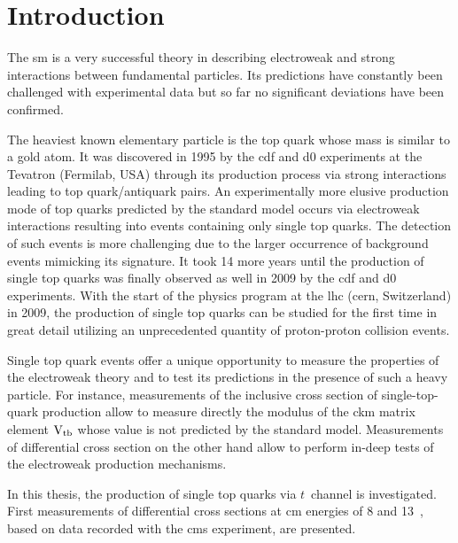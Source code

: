 \chapter*{Introduction}

The \acrlong{sm} is a very successful theory in describing electroweak and strong interactions between fundamental particles. Its predictions have constantly been challenged with experimental data but so far no significant deviations have been confirmed. 

The heaviest known elementary particle is the top quark whose mass is similar to a gold atom. It was discovered in 1995 by the \gls{cdf} and \gls{d0} experiments at the Tevatron (Fermilab, USA) through its production process via strong interactions leading to top quark/antiquark pairs. An experimentally more elusive production mode of top quarks predicted by the standard model occurs via electroweak interactions resulting into events containing only single top quarks. The detection of such events is more challenging due to the larger occurrence of background events mimicking its signature. It took 14 more years until the production of single top quarks was finally observed as well in 2009 by the \gls{cdf} and \gls{d0} experiments. With the start of the physics program at the \gls{lhc} (\gls{cern}, Switzerland) in 2009, the production of single top quarks can be studied for the first time in great detail utilizing an unprecedented quantity of proton-proton collision events.

Single top quark events offer a unique opportunity to measure the properties of the electroweak theory and to test its predictions in the presence of such a heavy particle. For instance, measurements of the inclusive cross section of single-top-quark production allow to measure directly the modulus of the \gls{ckm} matrix element ${\textrm{V}_\textrm{tb}}$ whose value is not predicted by the standard model. Measurements of differential cross section on the other hand allow to perform in-deep tests of the electroweak production mechanisms.

In this thesis, the production of single top quarks via $t$~channel is investigated.  First measurements of differential cross sections at \acrlong{cm} energies of 8 and 13~\TeV, based on data recorded with the \gls{cms} experiment, are presented. 

